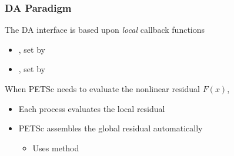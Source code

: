 \begin{frame}
\frametitle{DA Paradigm}

The DA interface is based upon \emph{local} callback functions
\begin{itemize}
  \item {}, set by 

  \medskip

  \item {}, set by 
\end{itemize}

\bigskip

  When PETSc needs to evaluate the nonlinear residual $F(x)$,
\begin{itemize}
  \item Each process evaluates the local residual

  \medskip

  \item PETSc assembles the global residual automatically
  \begin{itemize}
    \item Uses  method
  \end{itemize}
\end{itemize}
\end{frame}
